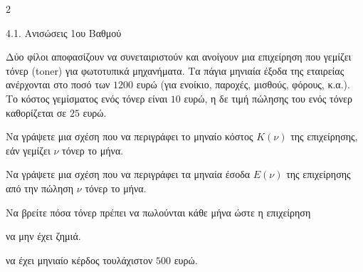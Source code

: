 \begin{ylh}{2}
    \item 4.1. Ανισώσεις 1ου Βαθμού
\end{ylh}
Δύο φίλοι αποφασίζουν να συνεταιριστούν και ανοίγουν μια επιχείρηση που γεμίζει τόνερ (toner) για φωτοτυπικά μηχανήματα. Τα πάγια μηνιαία έξοδα της εταιρείας ανέρχονται στο ποσό των $1200$ ευρώ (για ενοίκιο, παροχές, μισθούς, φόρους, κ.α.). Το κόστος γεμίσματος ενός τόνερ είναι $10$ ευρώ, η δε τιμή πώλησης του ενός τόνερ καθορίζεται σε $25$ ευρώ.

\begin{alist}
\item Να γράψετε μια σχέση που να περιγράφει το μηναίο κόστος $K(\nu)$ της επιχείρησης, εάν γεμίζει $\nu$ τόνερ το μήνα.
\item Να γράψετε μια σχέση που να περιγράφει τα μηναία έσοδα $E(\nu)$ της επιχείρησης από την πώληση $\nu$ τόνερ το μήνα.
\item Να βρείτε πόσα τόνερ πρέπει να πωλούνται κάθε μήνα ώστε η επιχείρηση

\begin{rlist}
\item να μην έχει ζημιά.
\item να έχει μηνιαίο κέρδος τουλάχιστον $500$ ευρώ.
\end{rlist}
\end{alist}

